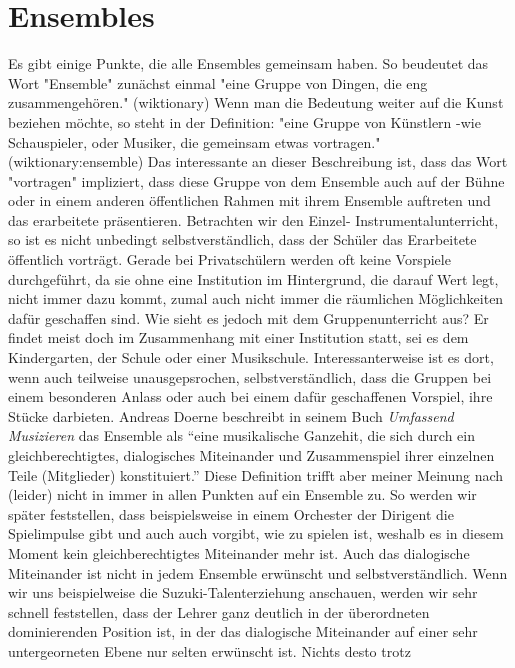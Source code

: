 \section{Ensembles}

Es gibt einige Punkte, die alle Ensembles gemeinsam haben. So beudeutet das Wort
"Ensemble" zunächst einmal "eine Gruppe von Dingen, die eng
zusammengehören." (wiktionary) Wenn man die Bedeutung weiter auf die Kunst
beziehen möchte, so steht in der Definition: "eine Gruppe von Künstlern -wie
Schauspieler, oder Musiker, die gemeinsam etwas vortragen."
(wiktionary:ensemble) Das interessante an dieser Beschreibung ist, dass das Wort
"vortragen" impliziert, dass diese Gruppe von dem Ensemble auch auf der Bühne
oder in einem anderen öffentlichen Rahmen mit ihrem Ensemble auftreten und das
erarbeitete präsentieren. Betrachten wir den Einzel- Instrumentalunterricht, so
ist es nicht unbedingt selbstverständlich, dass der Schüler das Erarbeitete
öffentlich vorträgt. Gerade bei Privatschülern werden oft keine Vorspiele
durchgeführt, da sie ohne eine Institution im Hintergrund, die darauf Wert legt,
nicht immer dazu kommt, zumal auch nicht immer die räumlichen Möglichkeiten dafür
geschaffen sind. Wie sieht es jedoch mit dem Gruppenunterricht aus? Er findet
meist doch im Zusammenhang mit einer Institution statt, sei es dem Kindergarten, der
Schule oder einer Musikschule. Interessanterweise ist es dort, wenn auch
teilweise unausgepsrochen, selbstverständlich, dass die Gruppen bei einem
besonderen Anlass oder auch bei einem dafür geschaffenen Vorspiel, ihre Stücke
darbieten. 
Andreas Doerne beschreibt in seinem Buch \emph{Umfassend Musizieren} das Ensemble als
\enquote{eine musikalische Ganzehit, die sich
durch ein gleichberechtigtes, dialogisches Miteinander und Zusammenspiel ihrer
einzelnen Teile (Mitglieder) konstituiert.}
\autocite[62]{doerne:umfassend_musizieren} Diese Definition trifft aber meiner
Meinung nach (leider) nicht in immer in allen Punkten auf ein Ensemble zu. So
werden wir später feststellen, dass beispielsweise in einem Orchester der
Dirigent die Spielimpulse gibt und auch auch vorgibt, wie zu spielen ist,
weshalb es in diesem Moment kein gleichberechtigtes Miteinander mehr ist. Auch
das dialogische Miteinander ist nicht in jedem Ensemble erwünscht und
selbstverständlich. Wenn wir uns beispielweise die Suzuki-Talenterziehung
anschauen, werden wir sehr schnell feststellen, dass der Lehrer ganz deutlich in
der überordneten dominierenden Position ist, in der das dialogische Miteinander
auf einer sehr untergeorneten Ebene nur selten erwünscht ist. Nichts desto trotz
